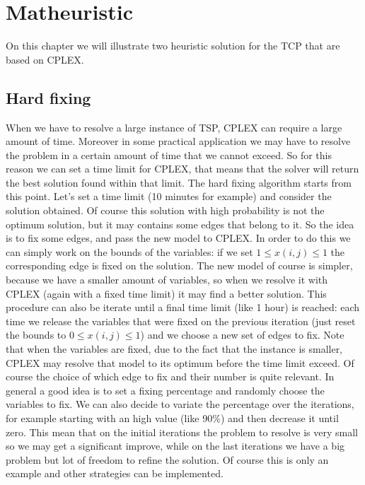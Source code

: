 \chapter{Matheuristic}
On this chapter we will illustrate two heuristic solution for the TCP that are based on CPLEX.

\section{Hard fixing}
When we have to resolve a large instance of TSP, CPLEX can require a large amount of time. Moreover in some practical application we may have to resolve the problem in a certain amount of time that we cannot exceed. So for this reason we can set a time limit for CPLEX, that means that the solver will return the best solution found within that limit. The hard fixing algorithm starts from this point. Let's set a time limit (10 minutes for example) and consider the solution obtained. Of course this solution with high probability is not the optimum solution, but it may contains some edges that belong to it. So the idea is to fix some edges, and pass the new model to CPLEX. In order to do this we can simply work on the bounds of the variables: if we set $1 \leq x(i,j) \leq 1$ the corresponding edge is fixed on the solution. The new model of course is simpler, because we have a smaller amount of variables, so when we resolve it with CPLEX (again with a fixed time limit) it may find a better solution. This procedure can also be iterate until a final time limit (like 1 hour) is reached: each time we release the variables that were fixed on the previous iteration (just reset the bounds to $0 \leq x(i,j) \leq 1$) and we choose a new set of edges to fix.
Note that when the variables are fixed, due to the fact that the instance is smaller, CPLEX may resolve that model to its optimum before the time limit exceed.
Of course the choice of which edge to fix and their number is quite relevant. In general a good idea is to set a fixing percentage and randomly choose the variables to fix. We can also decide to variate the percentage over the iterations, for example starting with an high value (like 90\%) and then decrease it until zero. This mean that on the initial iterations the problem to resolve is very small so we may get a significant improve, while on the last iterations we have a big problem but lot of freedom to refine the solution. Of course this is only an example and other strategies can be implemented.  

